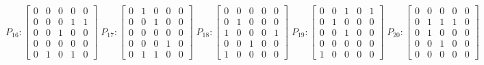     $$
        P_{16} : \begin{bmatrix}
            0 & 0 & 0 & 0 & 0 \\
            0 & 0 & 0 & 1 & 1 \\
            0 & 0 & 1 & 0 & 0 \\
            0 & 0 & 0 & 0 & 0 \\
            0 & 1 & 0 & 1 & 0
        \end{bmatrix}
        \;
         P_{17} : \begin{bmatrix}
            0 & 1 & 0 & 0 & 0 \\
            0 & 0 & 1 & 0 & 0 \\
            0 & 0 & 0 & 0 & 0 \\
            0 & 0 & 0 & 1 & 0 \\
            0 & 1 & 1 & 0 & 0
        \end{bmatrix}
        \;
        P_{18} : \begin{bmatrix}
            0 & 0 & 0 & 0 & 0 \\
            0 & 1 & 0 & 0 & 0 \\
            1 & 0 & 0 & 0 & 1 \\
            0 & 0 & 1 & 0 & 0 \\
            1 & 0 & 0 & 0 & 0
        \end{bmatrix}
        \;
        P_{19} : \begin{bmatrix}
            0 & 0 & 1 & 0 & 1 \\
            0 & 1 & 0 & 0 & 0 \\
            0 & 0 & 1 & 0 & 0 \\
            0 & 0 & 0 & 0 & 0 \\
            1 & 0 & 0 & 0 & 0
        \end{bmatrix}
        \;
        P_{20} : \begin{bmatrix}
            0 & 0 & 0 & 0 & 0 \\
            0 & 1 & 1 & 1 & 0 \\
            0 & 1 & 0 & 0 & 0 \\
            0 & 0 & 1 & 0 & 0 \\
            0 & 0 & 0 & 0 & 0
        \end{bmatrix}
    $$

